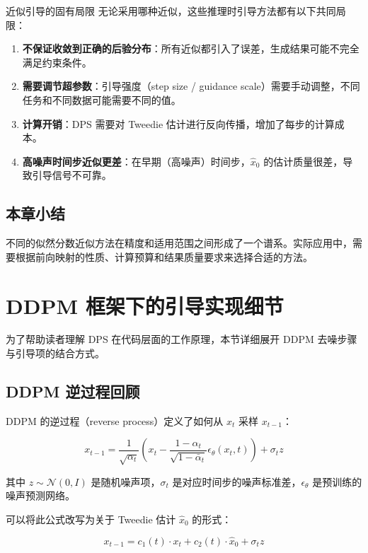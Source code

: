 \documentclass[a4paper]{article}
\begin{document}
\begin{warningbox}{近似引导的固有局限}
无论采用哪种近似，这些推理时引导方法都有以下共同局限：
\begin{enumerate}
    \item \textbf{不保证收敛到正确的后验分布}：所有近似都引入了误差，生成结果可能不完全满足约束条件。
    \item \textbf{需要调节超参数}：引导强度（step size / guidance scale）需要手动调整，不同任务和不同数据可能需要不同的值。
    \item \textbf{计算开销}：DPS 需要对 Tweedie 估计进行反向传播，增加了每步的计算成本。
    \item \textbf{高噪声时间步近似更差}：在早期（高噪声）时间步，$\hat{x}_0$ 的估计质量很差，导致引导信号不可靠。
\end{enumerate}
\end{warningbox}

\subsection{本章小结}

不同的似然分数近似方法在精度和适用范围之间形成了一个谱系。实际应用中，需要根据前向映射的性质、计算预算和结果质量要求来选择合适的方法。


\section{DDPM 框架下的引导实现细节}

为了帮助读者理解 DPS 在代码层面的工作原理，本节详细展开 DDPM 去噪步骤与引导项的结合方式。

\subsection{DDPM 逆过程回顾}

DDPM 的逆过程（reverse process）定义了如何从 $x_t$ 采样 $x_{t-1}$：

$$
x_{t-1} = \frac{1}{\sqrt{\alpha_t}} \left( x_t - \frac{1-\alpha_t}{\sqrt{1-\bar{\alpha}_t}} \epsilon_\theta(x_t, t) \right) + \sigma_t z
$$

其中 $z \sim \mathcal{N}(0, I)$ 是随机噪声项，$\sigma_t$ 是对应时间步的噪声标准差，$\epsilon_\theta$ 是预训练的噪声预测网络。

可以将此公式改写为关于 Tweedie 估计 $\hat{x}_0$ 的形式：

$$
x_{t-1} = c_1(t) \cdot x_t + c_2(t) \cdot \hat{x}_0 + \sigma_t z
$$
\end{document}
